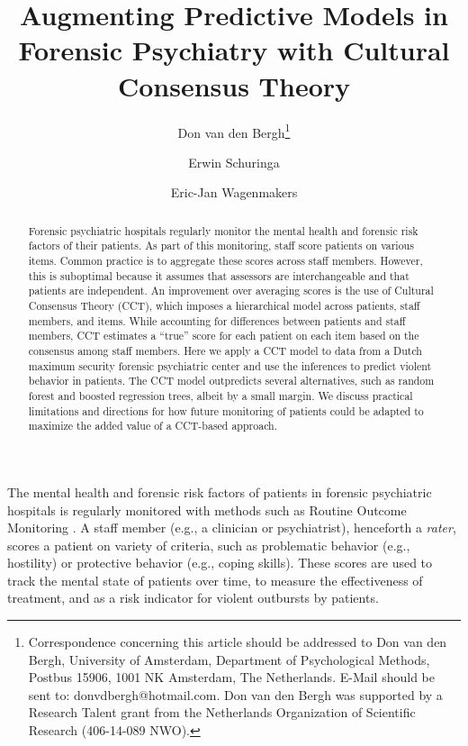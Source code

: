 \documentclass[a4paper,11pt]{article}
\title{Augmenting Predictive Models in Forensic Psychiatry with Cultural Consensus Theory}
\author[1]{Don van den Bergh\thanks{%
Correspondence concerning this article should be addressed to Don van den Bergh, University of Amsterdam, Department of Psychological Methods, Postbus 15906, 1001 NK Amsterdam, The Netherlands. 
E-Mail should be sent to: donvdbergh@hotmail.com.
Don van den Bergh was supported by a Research Talent grant from the Netherlands Organization of Scientific Research (406-14-089 NWO).}}
\author[2]{Erwin Schuringa}
\author[1]{Eric-Jan Wagenmakers}
\affil[1]{Department of Psychological Methods, University of Amsterdam}
\affil[2]{Forensic Psychiatric Center Dr. S. van Mesdag}
\date{}
\begin{document}
\maketitle


\begin{abstract}
Forensic psychiatric hospitals regularly monitor the mental health and forensic risk factors of their patients.
As part of this monitoring, staff score patients on various items.
Common practice is to aggregate these scores across staff members.
However, this is suboptimal because it assumes that assessors are interchangeable and that patients are independent.
An improvement over averaging scores is the use of Cultural Consensus Theory (CCT), which imposes a hierarchical model across patients, staff members, and items.
While accounting for differences between patients and staff members, CCT estimates a ``true'' score for each patient on each item based on the consensus among staff members.
Here we apply a CCT model to data from a Dutch maximum security forensic psychiatric center and use the inferences to predict violent behavior in patients.
The CCT model outpredicts several alternatives, such as random forest and boosted regression trees, albeit by a small margin.
We discuss practical limitations and directions for how future monitoring of patients could be adapted to maximize the added value of a CCT-based approach.
\end{abstract}


The mental health and forensic risk factors of patients in forensic psychiatric hospitals is regularly monitored with methods such as Routine Outcome Monitoring \parencite{deBeurs2011ROM}.
A staff member (e.g., a clinician or psychiatrist), henceforth a \emph{rater}, scores a patient on variety of criteria, such as problematic behavior (e.g., hostility) or protective behavior (e.g., coping skills).
These scores are used to track the mental state of patients over time, to measure the effectiveness of treatment, and as a risk indicator for violent outbursts by patients.
\end{document}
